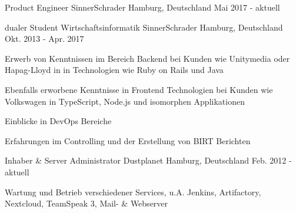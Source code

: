 

\begin{cventries}

  \cventry
    {Product Engineer} %
    {SinnerSchrader} %
    {Hamburg, Deutschland} %
    {Mai 2017 - aktuell} %
    {
    }

  \cventry
    {dualer Student Wirtschaftsinformatik} %
    {SinnerSchrader} %
    {Hamburg, Deutschland} %
    {Okt. 2013 - Apr. 2017} %
    {
      \begin{cvitems} %
        \item {Erwerb von Kenntnissen im Bereich Backend bei Kunden wie Unitymedia oder Hapag-Lloyd in in Technologien wie Ruby on Rails und Java}
        \item {Ebenfalls erworbene Kenntnisse in Frontend Technologien bei Kunden wie Volkswagen in TypeScript, Node.js und isomorphen Applikationen}
        \item {Einblicke in DevOps Bereiche}
        \item {Erfahrungen im Controlling und der Erstellung von BIRT Berichten}
      \end{cvitems}
    }

  \cventry
    {Inhaber \& Server Administrator} %
    {Dustplanet} %
    {Hamburg, Deutschland} %
    {Feb. 2012 - aktuell} %
    {
      \begin{cvitems} %
      	\item {Wartung und Betrieb verschiedener Services, u.A. Jenkins, Artifactory, Nextcloud, TeamSpeak 3, Mail- \& Webserver}
      \end{cvitems}
    }

\end{cventries}
